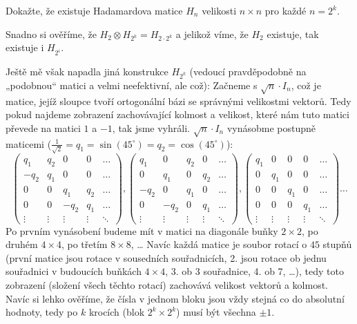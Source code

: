 \documentclass[12pt]{article}					%
\def\degree{^{\circ}}
\begin{document}
    \begin{priklad}[10.2]
        Dokažte, že existuje Hadamardova matice $H_n$ velikosti $n\times n$ pro každé $n = 2^k$.

        \begin{dukazin}
            Snadno si ověříme, že $H_2 \otimes H_{2^k} = H_{2·2^{k}}$ a jelikož víme, že $H_2$ existuje, tak existuje i $H_{2^i}$.

            Ještě mě však napadla jiná konstrukce $H_{2^k}$ (vedoucí pravděpodobně na „podobnou“ matici a velmi neefektivní, ale což): Začneme s $\sqrt{n}·I_n$, což je matice, jejíž sloupce tvoří ortogonální bázi se správnými velikostmi vektorů. Tedy pokud najdeme zobrazení zachovávající kolmost a velikost, které nám tuto matici převede na matici $1$ a $-1$, tak jsme vyhráli. $\sqrt{n}·I_n$ vynásobme postupně maticemi ($\frac{1}{\sqrt{2}} = q_1 = \sin(45\degree) = q_2 = \cos(45\degree)$):
            $$ \begin{pmatrix} q_1 & q_2 & 0 & 0 & … \\ -q_2 & q_1 & 0 & 0 & … \\ 0 & 0 & q_1 & q_2 & … \\ 0 & 0 & -q_2 & q_1 & … \\ \vdots & \vdots & \vdots & \vdots & \ddots \end{pmatrix}, \begin{pmatrix} q_1 & 0 & q_2 & 0 & … \\ 0 & q_1 & 0 & q_2 & … \\ -q_2 & 0 & q_1 & 0 & … \\ 0 & -q_2 & 0 & q_1 & … \\ \vdots & \vdots & \vdots & \vdots & \ddots \end{pmatrix}, \begin{pmatrix} q_1 & 0 & 0 & 0 & … \\ 0 & q_1 & 0 & 0 & … \\ 0 & 0 & q_1 & 0 & … \\ 0 & 0 & 0 & q_1 & … \\ \vdots & \vdots & \vdots & \vdots & \ddots \end{pmatrix}… $$
            Po prvním vynásobení budeme mít v matici na diagonále buňky $2\times 2$, po druhém $4 \times 4$, po třetím $8 \times 8$, … Navíc každá matice je soubor rotací o $45$ stupňů (první matice jsou rotace v sousedních souřadnicích, 2. jsou rotace ob jednu souřadnici v budoucích buňkách $4 \times 4$, 3. ob 3 souřadnice, 4. ob 7, …), tedy toto zobrazení (složení všech těchto rotací) zachovává velikost vektorů a kolmost. Navíc si lehko ověříme, že čísla v jednom bloku jsou vždy stejná co do absolutní hodnoty, tedy po $k$ krocích (blok $2^k \times 2^k$) musí být všechna $±1$.
        \end{dukazin}
    \end{priklad}
\end{document}

